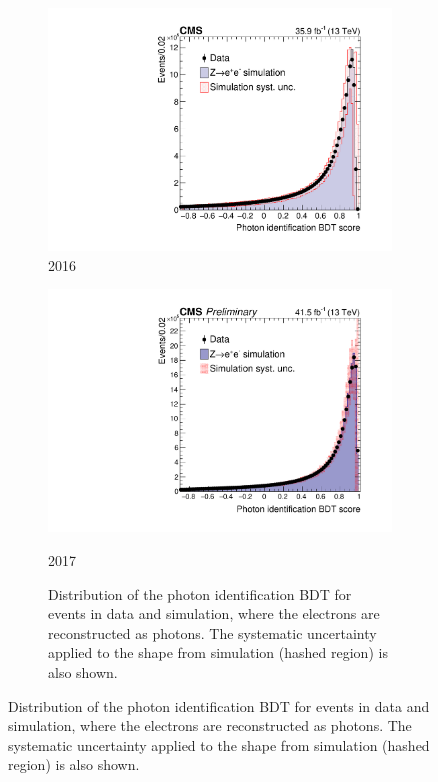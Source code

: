 \begin{figure}[h!]
  \centering
  \begin{subfigure}{0.45\textwidth}
    \includegraphics[width=\textwidth]{Figures/Objects/IDMVAZee_2016}
    \caption{2016}
    \label{fig:obj_IDMVAZee_2016}
  \end{subfigure}
  \begin{subfigure}{0.45\textwidth}
    \includegraphics[width=\textwidth]{Figures/Objects/IDMVAZee_2017}
    \caption{2017}
    \label{fig:obj_IDMVAZee_2016}
  \caption{Distribution of the photon identification BDT
  for \Zee events in data and simulation, where the electrons are reconstructed as
  photons. The systematic uncertainty applied to the shape from simulation (hashed region) is
  also shown.}
  \label{fig:obj_IDMVAZee}
  \end{subfigure}
\end{figure}

